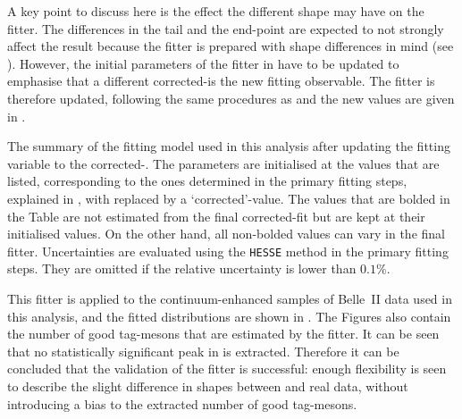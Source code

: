 A key point to discuss here is the effect the different \Mbc shape may have on the \Mbc fitter.
The differences in the tail and the end-point are expected to not strongly affect the result because the \Mbc fitter is prepared with shape differences in mind (see ).
However, the initial parameters of the \Mbc fitter in  have to be updated to emphasise that a different corrected-\Mbc is the new fitting observable.
The \Mbc fitter is therefore updated, following the same procedures as  and the new values are given in .
\begin{table}[htbp!]
    \centering
    \caption{\label{tab:fitting_init_params_updated} The summary of the \Mbc fitting model used in this analysis after updating the fitting variable to the corrected-\Mbc.
    The parameters are initialised at the values that are listed, corresponding to the ones determined in the primary fitting steps, explained in , with \Mbc replaced by a `corrected'-\Mbc value.
    The values that are bolded in the Table are not estimated from the final corrected-\Mbc fit but are kept at their initialised values.
    On the other hand, all non-bolded values can vary in the final fitter.
    Uncertainties are evaluated using the \texttt{HESSE} method in the primary fitting steps.
    They are omitted if the relative uncertainty is lower than $0.1\%$.
    }
    
\end{table}

This fitter is applied to the continuum-enhanced samples of Belle~II data used in this analysis,
and the  fitted \Mbc distributions are shown in .
The Figures also contain the number of good tag-\B mesons that are estimated by the fitter.
It can be seen that no statistically significant peak in \Mbc is extracted.
Therefore it can be concluded that the validation of the \Mbc fitter is successful: enough flexibility is seen
to describe the slight difference in \Mbc shapes between \MC and real data, without introducing a bias to the extracted number of good tag-\B mesons.


